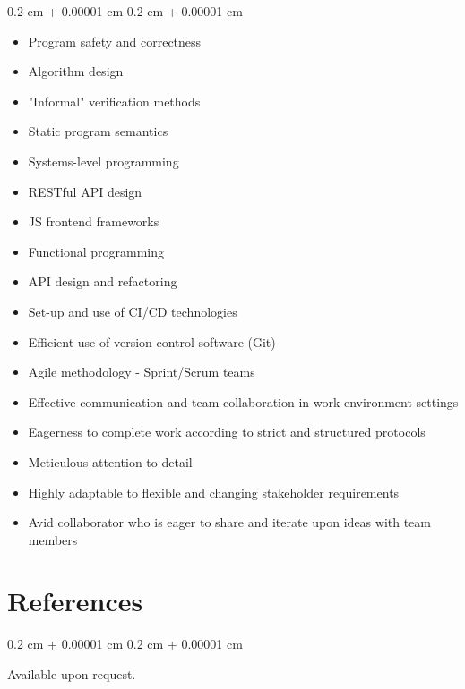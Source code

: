 \documentclass[10pt, a4paper]{article}
\newenvironment{highlightsforbulletentries}{
    \begin{itemize}[
        topsep=0.10 cm,
        parsep=0.10 cm,
        partopsep=0pt,
        itemsep=0pt,
        leftmargin=10pt
    ]
}{
    \end{itemize}
} %
\newenvironment{onecolentry}{
    \begin{adjustwidth}{
        0.2 cm + 0.00001 cm
    }{
        0.2 cm + 0.00001 cm
    }
}{
    \end{adjustwidth}
} %
\begin{document}
    \begin{onecolentry}
        \begin{highlightsforbulletentries}


        \item Program safety and correctness

        \item Algorithm design

        \item "Informal" verification methods

        \item Static program semantics

        \item Systems-level programming

        \item RESTful API design

        \item JS frontend frameworks

        \item Functional programming

        \item API design and refactoring

        \item Set-up and use of CI/CD technologies

        \item Efficient use of version control software (Git)

        \item Agile methodology - Sprint/Scrum teams

        \item Effective communication and team collaboration in work environment settings

        \item Eagerness to complete work according to strict and structured protocols

        \item Meticulous attention to detail

        \item Highly adaptable to flexible and changing stakeholder requirements

        \item Avid collaborator who is eager to share and iterate upon ideas with team members


        \end{highlightsforbulletentries}
    \end{onecolentry}

    \section{References}



        
        \begin{onecolentry}
            Available upon request.
        \end{onecolentry}


    
\end{document}
